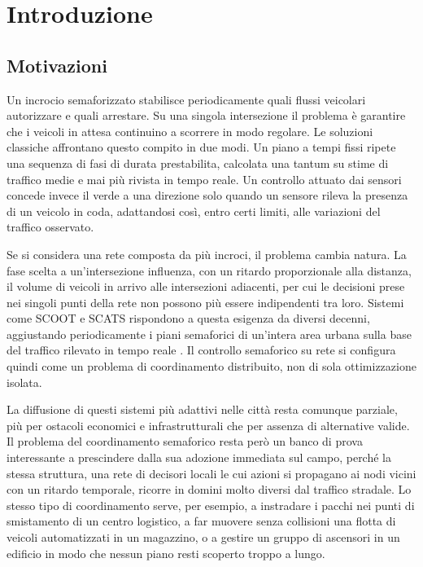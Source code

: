 \chapter{Introduzione}
\label{cap:introduzione}

\section{Motivazioni}
\label{sec:intro-motivazioni}

Un incrocio semaforizzato stabilisce periodicamente quali flussi veicolari
autorizzare e quali arrestare. Su una singola intersezione il problema è
garantire che i veicoli in attesa continuino a scorrere in modo regolare.
Le soluzioni classiche affrontano questo compito in due modi. Un piano a
tempi fissi ripete una sequenza di fasi di durata prestabilita, calcolata
una tantum su stime di traffico medie e mai più rivista in tempo reale. Un
controllo attuato dai sensori concede invece il verde a una direzione solo
quando un sensore rileva la presenza di un veicolo in coda, adattandosi
così, entro certi limiti, alle variazioni del traffico osservato.

Se si considera una rete composta da più incroci, il problema cambia
natura. La fase scelta a un'intersezione influenza, con un ritardo
proporzionale alla distanza, il volume di veicoli in arrivo alle
intersezioni adiacenti, per cui le decisioni prese nei singoli punti della
rete non possono più essere indipendenti tra loro. Sistemi come SCOOT e
SCATS rispondono a questa esigenza da diversi decenni, aggiustando
periodicamente i piani semaforici di un'intera area urbana sulla base del
traffico rilevato in tempo reale \citep{wei2020tscsurvey}. Il controllo
semaforico su rete si configura quindi come un problema di coordinamento
distribuito, non di sola ottimizzazione isolata.

La diffusione di questi sistemi più adattivi nelle città resta comunque
parziale, più per ostacoli economici e infrastrutturali che per assenza
di alternative valide. Il problema del coordinamento semaforico resta
però un banco di prova interessante a prescindere dalla sua adozione
immediata sul campo, perché la stessa struttura, una rete di decisori
locali le cui azioni si propagano ai nodi vicini con un ritardo temporale,
ricorre in domini molto diversi dal traffico stradale. Lo stesso tipo di
coordinamento serve, per esempio, a instradare i pacchi nei punti di
smistamento di un centro logistico, a far muovere senza collisioni una
flotta di veicoli automatizzati in un magazzino, o a gestire un gruppo di
ascensori in un edificio in modo che nessun piano resti scoperto troppo a
lungo.


